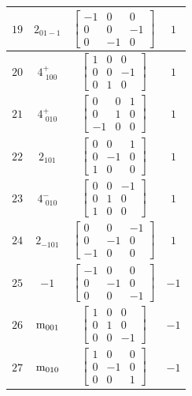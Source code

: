 \documentclass[fleqn,8pt]{jsarticle}
\begin{document}
\begin{longtable}{cccc}
$ 19 $ & $ 2{}_{01-1} $ & $ \begin{bmatrix} -1 & 0 & 0 \\ 0 & 0 & -1 \\ 0 & -1 & 0 \end{bmatrix} $ & $ 1 $ \\ \hline
$ 20 $ & $ 4^{+}_{\,\,100} $ & $ \begin{bmatrix} 1 & 0 & 0 \\ 0 & 0 & -1 \\ 0 & 1 & 0 \end{bmatrix} $ & $ 1 $ \\ \hline
$ 21 $ & $ 4^{+}_{\,\,010} $ & $ \begin{bmatrix} 0 & 0 & 1 \\ 0 & 1 & 0 \\ -1 & 0 & 0 \end{bmatrix} $ & $ 1 $ \\ \hline
$ 22 $ & $ 2{}_{101} $ & $ \begin{bmatrix} 0 & 0 & 1 \\ 0 & -1 & 0 \\ 1 & 0 & 0 \end{bmatrix} $ & $ 1 $ \\ \hline
$ 23 $ & $ 4^{-}_{\,\,010} $ & $ \begin{bmatrix} 0 & 0 & -1 \\ 0 & 1 & 0 \\ 1 & 0 & 0 \end{bmatrix} $ & $ 1 $ \\ \hline
$ 24 $ & $ 2{}_{-101} $ & $ \begin{bmatrix} 0 & 0 & -1 \\ 0 & -1 & 0 \\ -1 & 0 & 0 \end{bmatrix} $ & $ 1 $ \\ \hline
$ 25 $ & $ -1 $ & $ \begin{bmatrix} -1 & 0 & 0 \\ 0 & -1 & 0 \\ 0 & 0 & -1 \end{bmatrix} $ & $ -1 $ \\ \hline
$ 26 $ & $ {\rm m}_{001} $ & $ \begin{bmatrix} 1 & 0 & 0 \\ 0 & 1 & 0 \\ 0 & 0 & -1 \end{bmatrix} $ & $ -1 $ \\ \hline
$ 27 $ & $ {\rm m}_{010} $ & $ \begin{bmatrix} 1 & 0 & 0 \\ 0 & -1 & 0 \\ 0 & 0 & 1 \end{bmatrix} $ & $ -1 $ \\ \hline

\end{longtable}
\end{document}
